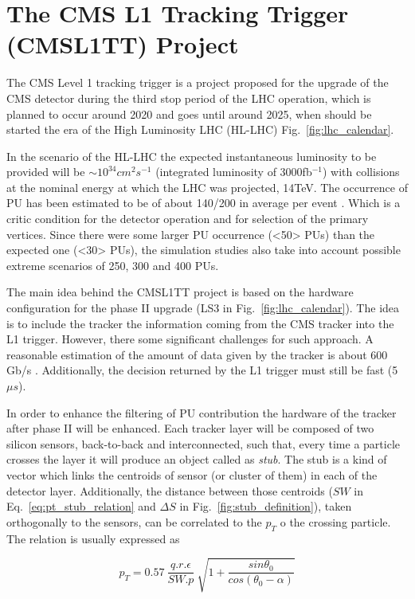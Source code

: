 \chapter{The CMS L1 Tracking Trigger (CMSL1TT) Project}
\label{app:cmsl1tt}
The CMS Level 1 tracking trigger is a project proposed for the upgrade of the CMS detector during the third stop period of the LHC operation, which is planned to occur around 2020 and goes until around 2025, when should be started the era of the High Luminosity LHC (HL-LHC) Fig.~\ref{fig:lhc_calendar}. 

In the scenario of the HL-LHC the expected instantaneous luminosity to be provided will be $\sim 10 ^{34} cm^{2}s^{-1}$ (integrated luminosity of 3000fb$^{-1}$) with collisions at the nominal energy at which the LHC was projected, 14TeV. The occurrence of PU has been estimated to be of about 140/200 in average per event \cite{bib:vertex-2017}. Which is a critic condition for the detector operation and for selection of the primary vertices. Since there were some larger PU occurrence (<50> PUs) than the expected one (<30> PUs), the simulation studies also take into account possible extreme scenarios of 250, 300 and 400 PUs. 

The main idea behind the CMSL1TT project is based on the hardware configuration for the phase II upgrade (LS3 in Fig.~\ref{fig:lhc_calendar}). The idea is to include the tracker the information coming from the CMS tracker into the L1 trigger. However, there some significant challenges for such approach. A reasonable estimation of the amount of data given by the tracker is about 600 Gb/s \cite{bib:vertex-2017}. Additionally, the decision returned by the L1 trigger must still be fast (5$\mu s$).

In order to enhance the filtering of PU contribution the hardware of the tracker after phase II will be enhanced. Each tracker layer will be composed of two silicon sensors, back-to-back and interconnected, such that, every time a particle crosses the layer it will produce an object called as \textit{stub}. The stub is a kind of vector which links the centroids of sensor (or cluster of them) in each of the detector layer. Additionally, the distance between those centroids ($SW$ in Eq.~\ref{eq:pt_stub_relation} and $\Delta S$ in Fig.~\ref{fig:stub_definition}), taken orthogonally to the sensors, can be correlated to the $p_{T}$ o the crossing particle. The relation is usually expressed as

\begin{equation}
p_{T} = 0.57 ~ \frac{q . r . \epsilon}{SW . p} ~ \sqrt{1+\frac{sin \theta_{0}}{cos(\theta_{0}-\alpha)}}
\label{eq:pt_stub_relation}
\end{equation}

